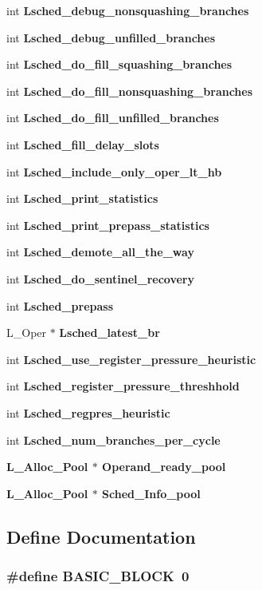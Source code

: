 \begin{CompactItemize}
\item 
int \bf{Lsched\_\-debug\_\-nonsquashing\_\-branches}
\item 
int \bf{Lsched\_\-debug\_\-unfilled\_\-branches}
\item 
int \bf{Lsched\_\-do\_\-fill\_\-squashing\_\-branches}
\item 
int \bf{Lsched\_\-do\_\-fill\_\-nonsquashing\_\-branches}
\item 
int \bf{Lsched\_\-do\_\-fill\_\-unfilled\_\-branches}
\item 
int \bf{Lsched\_\-fill\_\-delay\_\-slots}
\item 
int \bf{Lsched\_\-include\_\-only\_\-oper\_\-lt\_\-hb}
\item 
int \bf{Lsched\_\-print\_\-statistics}
\item 
int \bf{Lsched\_\-print\_\-prepass\_\-statistics}
\item 
int \bf{Lsched\_\-demote\_\-all\_\-the\_\-way}
\item 
int \bf{Lsched\_\-do\_\-sentinel\_\-recovery}
\item 
int \bf{Lsched\_\-prepass}
\item 
L\_\-Oper $\ast$ \bf{Lsched\_\-latest\_\-br}
\item 
int \bf{Lsched\_\-use\_\-register\_\-pressure\_\-heuristic}
\item 
int \bf{Lsched\_\-register\_\-pressure\_\-threshhold}
\item 
int \bf{Lsched\_\-regpres\_\-heuristic}
\item 
int \bf{Lsched\_\-num\_\-branches\_\-per\_\-cycle}
\item 
\bf{L\_\-Alloc\_\-Pool} $\ast$ \bf{Operand\_\-ready\_\-pool}
\item 
\bf{L\_\-Alloc\_\-Pool} $\ast$ \bf{Sched\_\-Info\_\-pool}
\end{CompactItemize}


\subsection{Define Documentation}
\subsubsection{\setlength{\rightskip}{0pt plus 5cm}\#define BASIC\_\-BLOCK~0}\label{l__schedule_8h_2ada784f937925e251cbc0a03eaee1c3}




